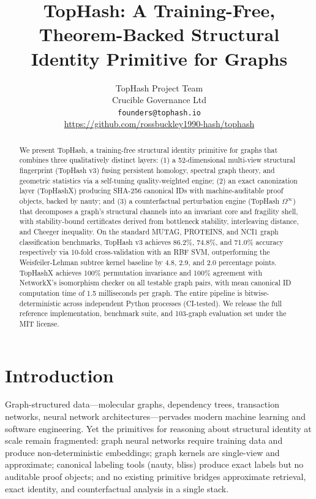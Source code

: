 \documentclass[11pt]{article}
\title{TopHash: A Training-Free, Theorem-Backed Structural Identity Primitive for Graphs}
\author{
  TopHash Project Team \\
  Crucible Governance Ltd \\
  \texttt{founders@tophash.io} \\
  \url{https://github.com/rossbuckley1990-hash/tophash}
}
\begin{document}
\maketitle

\begin{abstract}
We present TopHash, a training-free structural identity primitive for graphs that combines three qualitatively distinct layers: (1) a 52-dimensional multi-view structural fingerprint (TopHash v3) fusing persistent homology, spectral graph theory, and geometric statistics via a self-tuning quality-weighted engine; (2) an exact canonization layer (TopHashX) producing SHA-256 canonical IDs with machine-auditable proof objects, backed by nauty; and (3) a counterfactual perturbation engine (TopHash $\Omega^\infty$) that decomposes a graph's structural channels into an invariant core and fragility shell, with stability-bound certificates derived from bottleneck stability, interleaving distance, and Cheeger inequality. On the standard MUTAG, PROTEINS, and NCI1 graph classification benchmarks, TopHash v3 achieves 86.2\%, 74.8\%, and 71.0\% accuracy respectively via 10-fold cross-validation with an RBF SVM, outperforming the Weisfeiler-Lehman subtree kernel baseline by 4.8, 2.9, and 2.0 percentage points. TopHashX achieves 100\% permutation invariance and 100\% agreement with NetworkX's isomorphism checker on all testable graph pairs, with mean canonical ID computation time of 1.5 milliseconds per graph. The entire pipeline is bitwise-deterministic across independent Python processes (CI-tested). We release the full reference implementation, benchmark suite, and 103-graph evaluation set under the MIT license.
\end{abstract}

\section{Introduction}

Graph-structured data---molecular graphs, dependency trees, transaction networks, neural network architectures---pervades modern machine learning and software engineering. Yet the primitives for reasoning about structural identity at scale remain fragmented: graph neural networks require training data and produce non-deterministic embeddings; graph kernels are single-view and approximate; canonical labeling tools (nauty, bliss) produce exact labels but no auditable proof objects; and no existing primitive bridges approximate retrieval, exact identity, and counterfactual analysis in a single stack.
\end{document}
